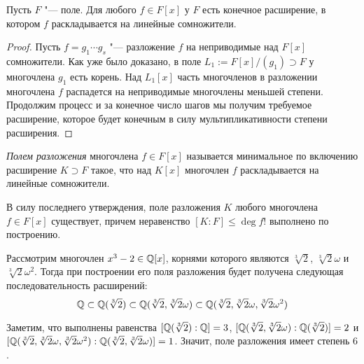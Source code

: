 \begin{proposition}
	Пусть $F$ "--- поле. Для любого $f \in F[x]$ у $F$ есть конечное расширение, в котором $f$ раскладывается на линейные сомножители.
\end{proposition}

\begin{proof}
	Пусть $f = g_1\dotsm g_s$ "--- разложение $f$ на неприводимые над $F[x]$ сомножители. Как уже было доказано, в поле $L_1 := F[x] / (g_1) \supset F$ у многочлена $g_1$ есть корень. Над $L_1[x]$ часть многочленов в разложении многочлена $f$ распадется на неприводимые многочлены меньшей степени. Продолжим процесс и за конечное число шагов мы получим требуемое расширение, которое будет конечным в силу мультипликативности степени расширения.
\end{proof}

\begin{definition}
	\textit{Полем разложения} многочлена $f \in F[x]$ называется минимальное по включению расширение $K \supset F$ такое, что над $K[x]$ многочлен $f$ раскладывается на линейные сомножители.
\end{definition}

\begin{note}
	В силу последнего утверждения, поле разложения $K$ любого многочлена $f \in F[x]$ существует, причем неравенство $[K : F] \le \deg{f}!$ выполнено по построению.
\end{note}

\begin{example}
	Рассмотрим многочлен $x^3 - 2 \in \mathbb{Q}[x]$, корнями которого являются $\sqrt[3]{2}$, $\sqrt[3]{2}\omega$ и $\sqrt[3]{2}\omega^2$. Тогда при построении его поля разложения будет получена следующая последовательность расширений:
	\[\mathbb{Q} \subset \mathbb{Q}(\sqrt[3]{2}) \subset \mathbb{Q}(\sqrt[3]{2}, \sqrt[3]{2}\omega) \subset \mathbb{Q}(\sqrt[3]{2}, \sqrt[3]{2}\omega, \sqrt[3]{2}\omega^2)\]
	
	Заметим, что выполнены равенства $[\mathbb{Q}(\sqrt[3]{2}) : \mathbb{Q}] = 3$, $[\mathbb{Q}(\sqrt[3]{2}, \sqrt[3]{2}\omega) : \mathbb{Q}(\sqrt[3]{2})] = 2$ и $[\mathbb{Q}(\sqrt[3]{2}, \sqrt[3]{2}\omega, \sqrt[3]{2}\omega^2) : \mathbb{Q}(\sqrt[3]{2}, \sqrt[3]{2}\omega)] = 1$. Значит, поле разложения имеет степень $6$.
\end{example}